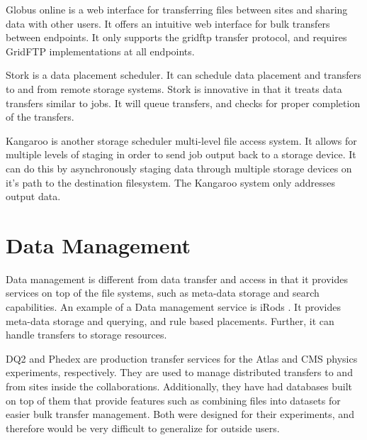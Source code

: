 Globus online \cite{foster2011globus} is a web interface for transferring files between sites and sharing data with other users.  It offers an intuitive web interface for bulk transfers between endpoints.  It only supports the gridftp \cite{allcock2005globus} transfer protocol, and requires GridFTP implementations at all endpoints.

Stork \cite{kosar2004stork} is a data placement scheduler.  It can schedule data placement and transfers to and from remote storage systems.  Stork is innovative in that it treats data transfers similar to jobs.  It will queue transfers, and checks for proper completion of the transfers.

Kangaroo \cite{thain2001kangaroo} is another storage scheduler multi-level file access system.  It allows for multiple levels of staging in order to send job output back to a storage device.  It can do this by asynchronously staging data through multiple storage devices on it's path to the destination filesystem.  The Kangaroo system only addresses output data.

\section{Data Management}

Data management is different from data transfer and access in that it provides services on top of the file systems, such as meta-data storage and search capabilities.  An example of a Data management service is iRods \cite{rajasekar2010irods}.  It provides meta-data storage and querying, and rule based placements.  Further, it can handle transfers to storage resources.

DQ2 \cite{branco2008managing} and Phedex \cite{rehn2006phedex} are production transfer services for the Atlas and CMS physics experiments, respectively.  They are used to manage distributed transfers to and from sites inside the collaborations.  Additionally, they have had databases built on top of them that provide features such as combining files into datasets for easier bulk transfer management.  Both were designed for their experiments, and therefore would be very difficult to generalize for outside users.



